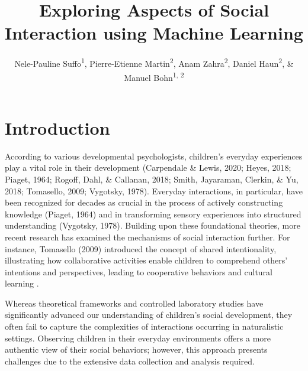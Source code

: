 \documentclass[
  man,floatsintext]{apa6}
\title{Exploring Aspects of Social Interaction using Machine Learning}
\author{Nele-Pauline Suffo\textsuperscript{1}, Pierre-Etienne Martin\textsuperscript{2}, Anam Zahra\textsuperscript{2}, Daniel Haun\textsuperscript{2}, \& Manuel Bohn\textsuperscript{1, 2}}
\date{}
\affiliation{\vspace{0.5cm}\textsuperscript{1} Institute of Psychology in Education, Leuphana University Lüneburg\\\textsuperscript{2} Max Planck Institute for Evolutionary Anthropology}
\begin{document}
\maketitle

\section{Introduction}\label{introduction}

According to various developmental psychologists, children's everyday experiences play a vital role in their development (Carpendale \& Lewis, 2020; Heyes, 2018; Piaget, 1964; Rogoff, Dahl, \& Callanan, 2018; Smith, Jayaraman, Clerkin, \& Yu, 2018; Tomasello, 2009; Vygotsky, 1978). Everyday interactions, in particular, have been recognized for decades as crucial in the process of actively constructing knowledge (Piaget, 1964) and in transforming sensory experiences into structured understanding (Vygotsky, 1978). Building upon these foundational theories, more recent research has examined the mechanisms of social interaction further. For instance, Tomasello (2009) introduced the concept of shared intentionality, illustrating how collaborative activities enable children to comprehend others' intentions and perspectives, leading to cooperative behaviors and cultural learning .

Whereas theoretical frameworks and controlled laboratory studies have significantly advanced our understanding of children's social development, they often fail to capture the complexities of interactions occurring in naturalistic settings. Observing children in their everyday environments offers a more authentic view of their social behaviors; however, this approach presents challenges due to the extensive data collection and analysis required.
\end{document}
